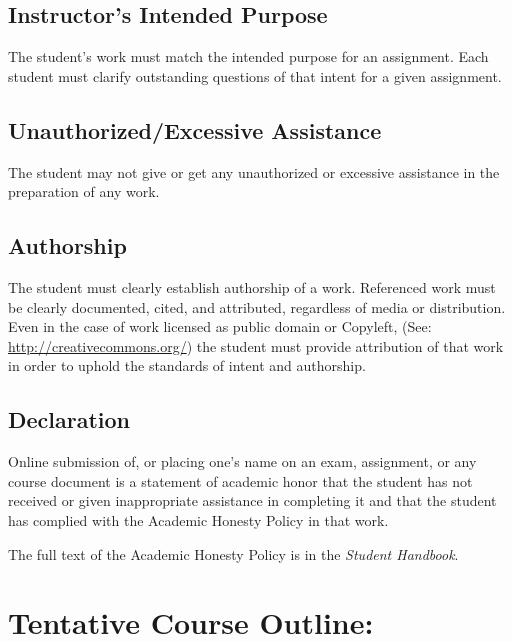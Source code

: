 \documentclass[11pt]{article}
\begin{document}
\subsection*{Instructor's Intended Purpose}
\label{sec:honesty-purp}

The student's work must match the intended purpose for an
assignment. Each student must clarify outstanding questions of that
intent for a given assignment.

\subsection*{Unauthorized/Excessive Assistance}
\label{sec:honest-assist}

The student may not give or get any unauthorized or excessive
assistance in the preparation of any work.

\subsection*{Authorship}
\label{sec:honesty-auth}

The student must clearly establish authorship of a work. Referenced
work must be clearly documented, cited, and attributed, regardless of
media or distribution. Even in the case of work licensed as public
domain or Copyleft, (See: \url{http://creativecommons.org/}) the student
must provide attribution of that work in order to uphold the standards
of intent and authorship.

\subsection*{Declaration}
\label{sec:honesty-dec}

Online submission of, or placing one's name on an exam, assignment, or
any course document is a statement of academic honor that the student
has not received or given inappropriate assistance in completing it
and that the student has complied with the Academic Honesty Policy in
that work.

The full text of the Academic Honesty Policy is in the \emph{Student
  Handbook}.

\section*{Tentative Course Outline:}
\label{sec:outline}
\end{document}
